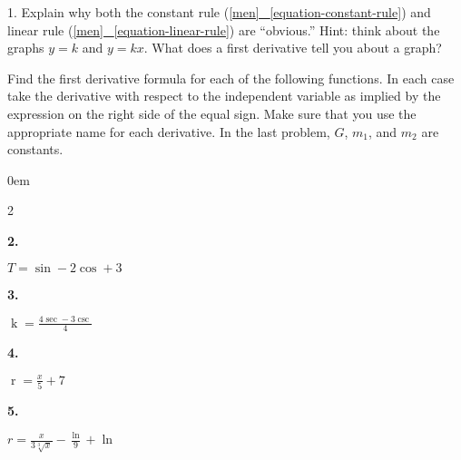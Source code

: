 \documentclass[12pt,]{book}
\theoremstyle{plain}
\theoremstyle{definition}
\numberwithin{equation}{section}
\newenvironment{exercisegroup}%
{\medskip\noindent}%
{\par\bigskip}%
\newlength{\exercisegroupindent}%
\newlength{\exercisegroupitemwidth}%
\newenvironment{exercisegrouplist}%
{\vspace{-\partopsep}%
\begin{adjustwidth}{\exercisegroupindent}{0em}}%
{\end{adjustwidth}%
\vspace{-\partopsep}%
\vspace{\baselineskip}}%
\newenvironment{exercisegroupbycol}[1]%
{\begin{exercisegrouplist}%
\vspace{-\multicolsep}%
\begin{multicols}{#1}%
\setlength{\parindent}{0em}%
\setlength{\exercisegroupitemwidth}{\linewidth}}%
{\end{multicols}%
\vspace{-\multicolsep}%
\end{exercisegrouplist}}%
\newenvironment{exercisegroupitem}[1]%
{\begin{minipage}[t]{\exercisegroupitemwidth}
\vspace{0pt}%
{\bfseries#1}%
\rule{0pt}{\baselineskip}}{\strut%
\end{minipage}%
\hspace{\columnsep}}%
\providecommand\phantomsection{}
\newcommand{\fe}[2]{\mathop{{#1}{\left(#2\right)}}}
\begin{document}
\begin{exerciselist}
\item[1.]\phantomsection\hypertarget{exercise-245}{\null}Explain why both the constant rule (\hyperref[equation-constant-rule]{[men]
~\ref*{equation-constant-rule}}) and linear rule (\hyperref[equation-linear-rule]{[men]
~\ref*{equation-linear-rule}}) are ``obvious.'' Hint: think about the graphs \(y=k\) and \(y=kx\).  What does a first derivative tell you about a graph?%
\par\smallskip
\end{exerciselist}
\begin{exercisegroup}%
Find the first derivative formula for each of the following functions.  In each case take the derivative with respect to the independent variable as implied by the expression on the right side of the equal sign.  Make sure that you use the appropriate name for each derivative. In the last problem, \(G\), \(m_1\), and \(m_2\) are constants.%
\begin{exercisegroupbycol}{2}%
\begin{exercisegroupitem}{2. }\phantomsection\hypertarget{exercise-246}{\null}
\(T=\fe{\sin}{t}-2\fe{\cos}{t}+3\)%
\end{exercisegroupitem}%
\par%
\begin{exercisegroupitem}{3. }\phantomsection\hypertarget{exercise-247}{\null}
\(\fe{k}{\theta}=\frac{4\fe{\sec}{\theta}-3\fe{\csc}{\theta}}{4}\)%
\end{exercisegroupitem}%
\par%
\begin{exercisegroupitem}{4. }\phantomsection\hypertarget{exercise-248}{\null}
\(\fe{r}{x}=\frac{x}{5}+7\)%
\end{exercisegroupitem}%
\par%
\begin{exercisegroupitem}{5. }\phantomsection\hypertarget{exercise-249}{\null}
\(r=\frac{x}{3\sqrt[3]{x}}-\frac{\fe{\ln}{x}}{9}+\fe{\ln}{2}\)%
\end{exercisegroupitem}%
\par%
\end{exercisegroupbycol}%
\end{exercisegroup}%
\typeout{************************************************}
\typeout{************************************************}
\end{document}
